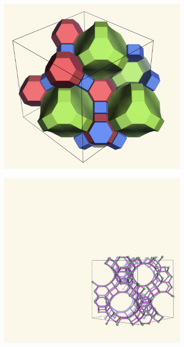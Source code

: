 \documentclass{beamer}
\begin{document}
\begin{frame}
  \begin{center}
    \includegraphics[height=3.5in]{fau-tiling-new}
  \end{center}
\end{frame}

\begin{frame}
  \begin{center}
    \includegraphics[height=3.5in]{fau-111}
  \end{center}
\end{frame}
\end{document}
